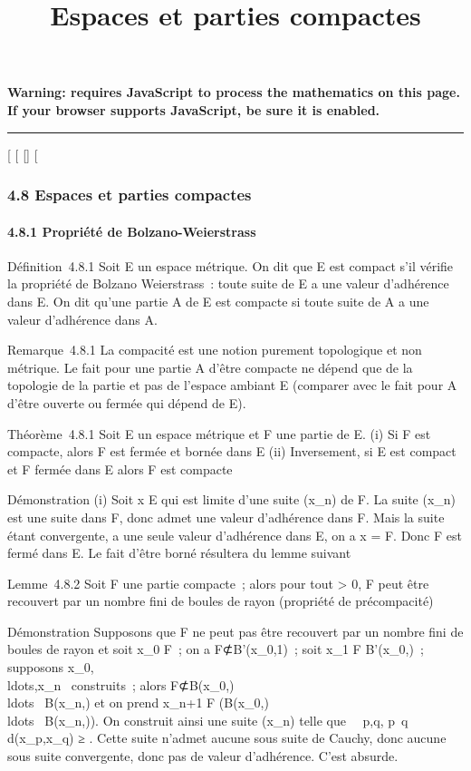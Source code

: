 \documentclass[]{article}
\title{Espaces et parties compactes}
\author{}
\date{}
\begin{document}
\maketitle

\textbf{Warning: 
requires JavaScript to process the mathematics on this page.\\ If your
browser supports JavaScript, be sure it is enabled.}

\begin{center}\rule{3in}{0.4pt}\end{center}

{[}
{[}
{[}{]}
{[}

\subsubsection{4.8 Espaces et parties compactes}

\paragraph{4.8.1 Propriété de Bolzano-Weierstrass}

Définition~4.8.1 Soit E un espace métrique. On dit que E est compact
s'il vérifie la propriété de Bolzano Weierstrass~: toute suite de E a
une valeur d'adhérence dans E. On dit qu'une partie A de E est compacte
si toute suite de A a une valeur d'adhérence dans A.

Remarque~4.8.1 La compacité est une notion purement topologique et non
métrique. Le fait pour une partie A d'être compacte ne dépend que de la
topologie de la partie et pas de l'espace ambiant E (comparer avec le
fait pour A d'être ouverte ou fermée qui dépend de E).

Théorème~4.8.1 Soit E un espace métrique et F une partie de E. (i) Si F
est compacte, alors F est fermée et bornée dans E (ii) Inversement, si E
est compact et F fermée dans E alors F est compacte

Démonstration (i) Soit x \in E qui est limite d'une suite (x\_n)
de F. La suite (x\_n) est une suite dans F, donc admet une
valeur d'adhérence \ell dans F. Mais la suite étant convergente, a une
seule valeur d'adhérence dans E, on a x = \ell \in F. Donc F est fermé dans
E. Le fait d'être borné résultera du lemme suivant

Lemme~4.8.2 Soit F une partie compacte~; alors pour tout \epsilon
\textgreater{} 0, F peut être recouvert par un nombre fini de boules de
rayon \epsilon (propriété de précompacité)

Démonstration Supposons que F ne peut pas être recouvert par un nombre
fini de boules de rayon \epsilon et soit x\_0 \in F~; on a
F⊄B'(x\_0,1)~; soit x\_1 \in F \diagdown B'(x\_0,\epsilon)~;
supposons
x\_0,\\ldots,x\_n~
construits~; alors F⊄B(x\_0,\epsilon)
\cup\\ldots~ \cup
B(x\_n,\epsilon) et on prend x\_n+1 \in F \diagdown\left
(B(x\_0,\epsilon)
\cup\\ldots~ \cup
B(x\_n,\epsilon)\right ). On construit ainsi une suite
(x\_n) telle que \forall~~p,q,
p\neq~q \rigtharrow~ d(x\_p,x\_q) ≥ \epsilon. Cette
suite n'admet aucune sous suite de Cauchy, donc aucune sous suite
convergente, donc pas de valeur d'adhérence. C'est absurde.
\end{document}
